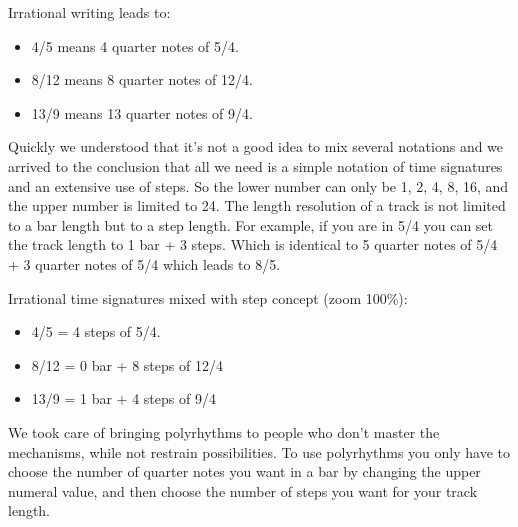 Irrational writing leads to:

\begin{itemize}
\item 4/5 means 4 quarter notes of 5/4.
\item 8/12 means 8 quarter notes of 12/4.
\item 13/9 means 13 quarter notes of 9/4.
\end{itemize}

Quickly we understood that it's not a good idea to mix several notations and we arrived to the conclusion that all we need is a simple notation of time signatures and an extensive use of steps. So the lower number can only be 1, 2, 4, 8, 16, and the upper number is limited to 24. The length resolution of a track is not limited to a bar length but to a step length. For example, if you are in 5/4 you can set the track length to 1 bar + 3 steps. Which is identical to 5 quarter notes of 5/4 + 3 quarter notes of 5/4 which leads to 8/5.

Irrational time signatures mixed with step concept (zoom 100\%):

\begin{itemize}
\item 4/5 = 4 steps of 5/4.
\item 8/12 = 0 bar + 8 steps of 12/4
\item 13/9 = 1 bar + 4 steps of 9/4
\end{itemize}

We took care of bringing polyrhythms to people who don't master the mechanisms, while not restrain possibilities. To use polyrhythms you only have to choose the number of quarter notes you want in a bar by changing the upper numeral value, and then choose the number of steps you want for your track length.

